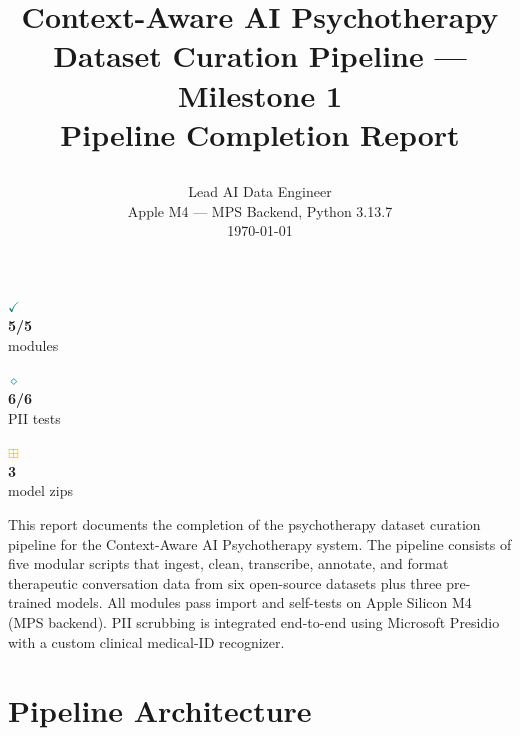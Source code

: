 \documentclass[11pt,a4paper]{article}
\title{
  \begingroup
  \sffamily\bfseries
  \vspace{-2em}
  {\LARGE Context-Aware AI Psychotherapy}\\[0.3em]
  {\Large \color{indigodark} Dataset Curation Pipeline — Milestone 1}\\[0.3em]
  {\large \color{tealdark} Pipeline Completion Report}\\[2em]
  \endgroup
}
\author{
  \begingroup
  \sffamily
  {\large Lead AI Data Engineer}\\[0.5em]
  {\large \color{tealdark} Apple M4 — MPS Backend, Python 3.13.7}\\[0.3em]
  {\footnotesize \today}
  \endgroup
}
\date{}
\begin{document}
\maketitle

\begin{center}
\begin{tcolorbox}[scoreBox={\large Milestone 1 — COMPLETE},width=0.9\linewidth,center]
\begin{minipage}{0.28\linewidth}
  \centering
  \Huge\color{indigodark}\textcolor{teal}{\Large $\checkmark$}\\
  {\sffamily\bfseries 5/5}\\
  {\sffamily\color{gray} modules}
\end{minipage}
\begin{minipage}{0.28\linewidth}
  \centering
  \Huge\color{teal}\textcolor{teal}{\Large $\diamond$}\\
  {\sffamily\bfseries 6/6}\\
  {\sffamily\color{gray} PII tests}
\end{minipage}
\begin{minipage}{0.28\linewidth}
  \centering
  \Huge\color{orange}\textcolor{orange}{\Large $\boxplus$}\\
  {\sffamily\bfseries 3}\\
  {\sffamily\color{gray} model zips}
\end{minipage}
\end{tcolorbox}
\end{center}

\vspace{1em}

\begin{tcolorbox}[infoBox={Executive Summary}]
This report documents the completion of the psychotherapy dataset curation pipeline for the Context-Aware AI Psychotherapy system. The pipeline consists of five modular scripts that ingest, clean, transcribe, annotate, and format therapeutic conversation data from six open-source datasets plus three pre-trained models. All modules pass import and self-tests on Apple Silicon M4 (MPS backend). PII scrubbing is integrated end-to-end using Microsoft Presidio with a custom clinical medical-ID recognizer.
\end{tcolorbox}

\section{Pipeline Architecture}
\end{document}
